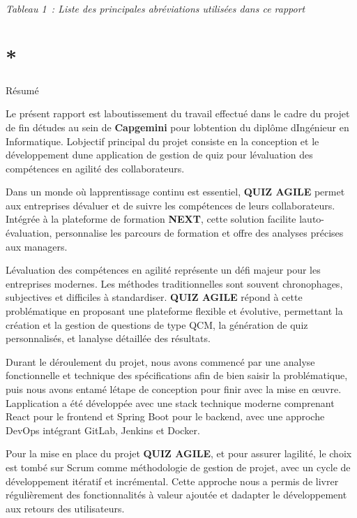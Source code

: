 \documentclass[12pt,a4paper,twoside,openright]{report}
\let\origchapter\chapter
\renewcommand{\chapter}[1]{%
  \cleardoublepage%
  \origchapter{#1}%
}
\begin{document}
\begin{center}
\textit{Tableau 1~: Liste des principales abréviations utilisées dans ce rapport}
\end{center}

\chapter*{Résumé}

Le présent rapport est l\textquotesingle aboutissement du travail
effectué dans le cadre du projet de fin d\textquotesingle études au sein
de \textbf{Capgemini} pour l\textquotesingle obtention du diplôme
d\textquotesingle Ingénieur en Informatique. L\textquotesingle objectif
principal du projet consiste en la conception et le développement
d\textquotesingle une application de gestion de quiz pour
l\textquotesingle évaluation des compétences en agilité des
collaborateurs.

Dans un monde où l\textquotesingle apprentissage continu est essentiel,
\textbf{QUIZ AGILE} permet aux entreprises d\textquotesingle évaluer et
de suivre les compétences de leurs collaborateurs. Intégrée à la
plateforme de formation \textbf{NEXT}, cette solution facilite
l\textquotesingle auto-évaluation, personnalise les parcours de
formation et offre des analyses précises aux managers.

L\textquotesingle évaluation des compétences en agilité représente un
défi majeur pour les entreprises modernes. Les méthodes traditionnelles
sont souvent chronophages, subjectives et difficiles à standardiser.
\textbf{QUIZ AGILE} répond à cette problématique en proposant une
plateforme flexible et évolutive, permettant la création et la gestion
de questions de type QCM, la génération de quiz personnalisés, et
l\textquotesingle analyse détaillée des résultats.

Durant le déroulement du projet, nous avons commencé par une analyse
fonctionnelle et technique des spécifications afin de bien saisir la
problématique, puis nous avons entamé l\textquotesingle étape de
conception pour finir avec la mise en œuvre.
L\textquotesingle application a été développée avec une stack technique
moderne comprenant React pour le frontend et Spring Boot pour le
backend, avec une approche DevOps intégrant GitLab, Jenkins et Docker.

Pour la mise en place du projet \textbf{QUIZ AGILE}, et pour assurer
l\textquotesingle agilité, le choix est tombé sur Scrum comme
méthodologie de gestion de projet, avec un cycle de développement
itératif et incrémental. Cette approche nous a permis de livrer
régulièrement des fonctionnalités à valeur ajoutée et
d\textquotesingle adapter le développement aux retours des utilisateurs.
\end{document}

